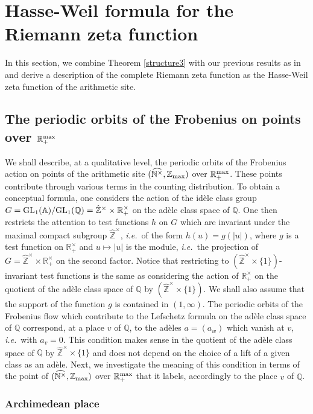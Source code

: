 \documentclass[noams,lp]{compositio}
\def\GL{{\rm GL}}
\def\A{{\mathbb A}}
\def\N{{\mathbb N}}
\def\Q{{\mathbb Q}}
\def\R{{\mathbb R}}
\def\Z{{\mathbb Z}}
\newcommand{\ie}{{\it i.e.\/}\ }
\def\zmax{{\Z_{\rm max}}}
\def\rmax{\R_+^{\rm max}}
\def\arith{{(\wnt,\bar \N)}}
\def\wnt{{\widehat{\N^{\times}}}}
\def\arith{{(\wnt,\zmax)}}
\def\hatz{{\hat\Z^\times}}
\begin{document}
\section{Hasse-Weil formula for the Riemann zeta function}\label{secthw}

In this section, we combine  Theorem \ref{structure3} with our previous results as in  \cite{CC1, CC2} and derive a description of the complete Riemann zeta function  as the Hasse-Weil zeta function of the arithmetic site. 

 \subsection{The periodic orbits of the Frobenius on points over $\rmax$}\label{periodicsect}

We shall describe, at a qualitative level, the periodic orbits of the Frobenius action on points of the arithmetic site $\arith$ over $\rmax$. These points contribute through various terms in the counting distribution. To obtain a conceptual formula, one considers the action of the id\`ele class group $G=\GL_1(\A)/\GL_1(\Q)=\hatz\times \R_+^\times$ on the ad\`ele class space of $\Q$. One then restricts the attention to test functions $h$ on $G$ which are invariant under the maximal compact subgroup $\hatz$, \ie of the form $h(u)=g(|u|)$, where $g$ is a test function on $\R_+^\times$ and $u\mapsto |u|$ is the module, \ie the projection of $G=\hatz\times \R_+^\times$ on the second factor.  Notice that restricting to $(\hatz\times \{1\})$-invariant test functions is the same as considering the action of $\R_+^\times$ on the  quotient of the ad\`ele class space of $\Q$ by $(\hatz\times \{1\})$. We shall also assume that  the support of the function $g$ is contained in
$(1,\infty)$. \newline
The periodic orbits of the Frobenius flow which contribute to the Lefschetz formula on the ad\`ele class space of $\Q$ correspond, at a place $v$ of $\Q$, to the ad\`eles $a=(a_w)$ which vanish at $v$, \ie with $a_v=0$. This condition makes sense in the  quotient of the ad\`ele class space of $\Q$ by $\hatz\times \{1\}$ and does not depend on the choice of a lift of a given class as an ad\`ele. Next, we investigate the meaning of this condition in terms of the point of $\arith$ over $\rmax$ that it labels, accordingly to the place $v$ of $\Q$.

\subsubsection*{Archimedean place}
\end{document}
